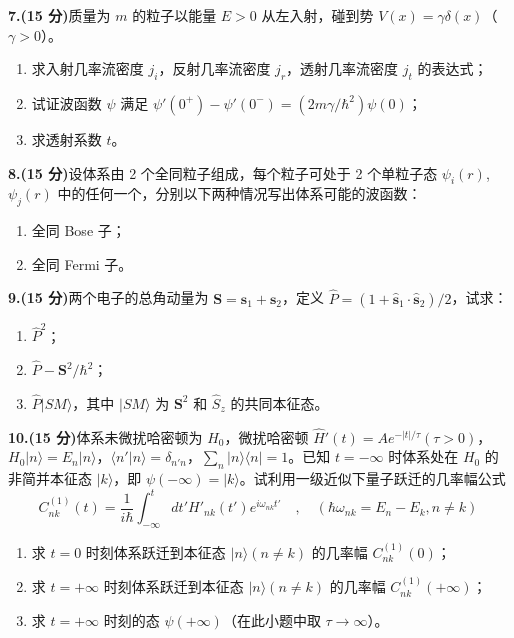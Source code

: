 \textbf{7.(15 分)}质量为 $m$ 的粒子以能量 $E > 0$ 从左入射，碰到势 $V(x) = \gamma \delta(x)$（$\gamma > 0$）。

\begin{enumerate}
    \item 求入射几率流密度 $j_i$，反射几率流密度 $j_r$，透射几率流密度 $j_t$ 的表达式；
    \item 试证波函数 $\psi$ 满足 $\psi'(0^+) - \psi'(0^-) = (2m\gamma/\hbar^2)\psi(0)$；
    \item 求透射系数 $t$。
\end{enumerate}

\textbf{8.(15 分)}设体系由 2 个全同粒子组成，每个粒子可处于 2 个单粒子态 $\psi_i(r)$, $\psi_j(r)$ 中的任何一个，分别以下两种情况写出体系可能的波函数：

\begin{enumerate}
    \item 全同 Bose 子；
    \item 全同 Fermi 子。
\end{enumerate}

\textbf{9.(15 分)}两个电子的总角动量为 $\mathbf{S} = \mathbf{s}_1 + \mathbf{s}_2$，定义 $\hat{P} = (1 + \hat{\mathbf{s}}_1 \cdot \hat{\mathbf{s}}_2)/2$，试求：

\begin{enumerate}
    \item  $\hat{P}^2$；
    \item  $\hat{P} - \mathbf{S}^2/\hbar^2$；
    \item  $\hat{P}|SM\rangle$，其中 $|SM\rangle$ 为 $\mathbf{S}^2$ 和 $\hat{S}_z$ 的共同本征态。
\end{enumerate}

\textbf{10.(15 分)}体系未微扰哈密顿为 $H_0$，微扰哈密顿 $\hat{H}'(t) = A e^{-|t|/\tau}(\tau > 0)$，$H_0|n\rangle = E_n |n\rangle$，$\langle n'|n\rangle = \delta_{n'n}$，$\sum_n |n\rangle \langle n| = 1$。已知 $t = -\infty$ 时体系处在 $H_0$ 的非简并本征态 $|k\rangle$，即 $\psi(-\infty) = |k\rangle$。试利用一级近似下量子跃迁的几率幅公式
\[
C_{nk}^{(1)}(t) = \frac{1}{i\hbar} \int_{-\infty}^{t} dt' H'_{nk}(t') e^{i\omega_{nk}t'} \quad , \quad (\hbar\omega_{nk} = E_n - E_k, n \neq k)~
\]
\begin{enumerate}
    \item  求 $t = 0$ 时刻体系跃迁到本征态 $|n\rangle (n \neq k)$ 的几率幅 $C_{nk}^{(1)}(0)$；
    \item  求 $t = +\infty$ 时刻体系跃迁到本征态 $|n\rangle (n \neq k)$ 的几率幅 $C_{nk}^{(1)}(+\infty)$；
    \item  求 $t = +\infty$ 时刻的态 $\psi(+\infty)$（在此小题中取 $\tau \to \infty$）。
\end{enumerate}